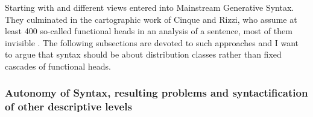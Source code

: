 {}%
Starting with \citet{Larson88a} and \citet{Pollock89a-u} different views entered into Mainstream
Generative Syntax. They culminated in the cartographic work of Cinque and Rizzi, who assume at least
400 so-called functional heads in an analysis of a sentence, most of them invisible \citep[]{CR2010a}. The following subsections are devoted to such approaches and I want to argue that
syntax should be about distribution classes rather than fixed cascades of functional heads.

\subsubsection{Autonomy of Syntax, resulting problems and syntactification of other descriptive levels}
\label{sec-autonomy-of-syntax}

